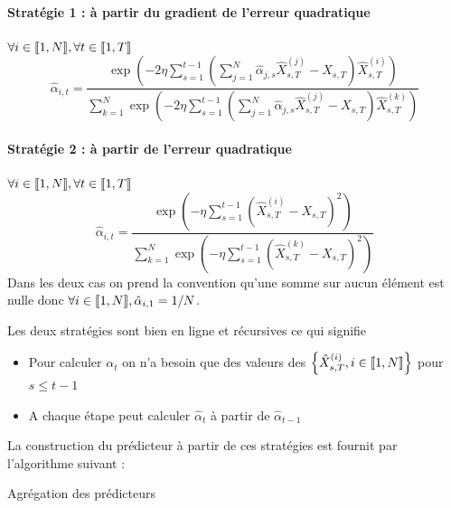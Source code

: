 \documentclass{report}
\begin{document}
\paragraph{Stratégie 1 : à partir du gradient de l'erreur quadratique}
$\forall i \in {\left\llbracket 1,N \right\rrbracket}, \forall t\in {\left\llbracket 1,T \right\rrbracket}$
$$
\hat{\alpha}_{i,t} = \frac{\exp\left( -2\eta \sum_{s=1}^{t-1} \left( \sum_{j=1}^N \hat{\alpha}_{j,s} \hat{X}_{s,T}^{(j)}-X_{s,T} \right)\hat{X}_{s,T}^{(i)}\right)}{\sum_{k=1}^N \exp\left( -2\eta \sum_{s=1}^{t-1} \left( \sum_{j=1}^N \hat{\alpha}_{j,s} \hat{X}_{s,T}^{(j)}-X_{s,T} \right)\hat{X}_{s,T}^{(k)}\right)}
$$
\paragraph{Stratégie 2 : à partir de l'erreur quadratique}
$\forall i \in {\left\llbracket 1,N \right\rrbracket}, \forall t\in {\left\llbracket 1,T \right\rrbracket}$
$$
\hat{\alpha}_{i,t} = \frac{\exp\left( -\eta \sum_{s=1}^{t-1} \left( \hat{X}_{s,T}^{(i)} - X_{s,T}\right)^2\right)}{\sum_{k=1}^N \exp\left( -\eta \sum_{s=1}^{t-1} \left( \hat{X}_{s,T}^{(k)} - X_{s,T}\right)^2\right)}
$$
Dans les deux cas on prend la convention qu'une somme sur aucun élément est nulle donc $\forall i \in {\left\llbracket 1,N \right\rrbracket}, \hat{\alpha}_{i,1} = 1/N$. 
\begin{Rque}
Les deux stratégies sont bien en ligne et récursives ce qui signifie 
\begin{itemize}
\item Pour calculer $\alpha_t$ on n'a besoin que des valeurs des ${ \left\lbrace  \hat{X}_{s,T}^{(i)}, i\in {\left\llbracket 1,N \right\rrbracket} \right\rbrace }$ pour $s\leq t-1$
\item A chaque étape peut calculer $\hat{\alpha}_t$ à partir de $\hat{\alpha}_{t-1}$
\end{itemize}
\end{Rque}
La construction du prédicteur à partir de ces stratégies est fournit par l'algorithme suivant : \\
\begin{algorithm}[H]
 \caption{Agrégation des prédicteurs}
 \label{algo:agregation}
\end{algorithm}
\end{document}
